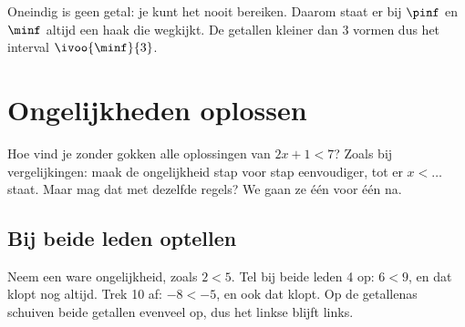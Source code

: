 Oneindig is geen getal: je kunt het nooit bereiken. Daarom staat er bij $\pinf$ en $\minf$ altijd een haak die wegkijkt. De getallen kleiner dan 3 vormen dus het interval $\ivoo{\minf}{3}$.



\begin{oefeningen}

\end{oefeningen}

\section{Ongelijkheden oplossen}

Hoe vind je zonder gokken alle oplossingen van $2x + 1 < 7$? Zoals bij vergelijkingen: maak de ongelijkheid stap voor stap eenvoudiger, tot er $x < \ldots$ staat. Maar mag dat met dezelfde regels? We gaan ze één voor één na.

\subsection{Bij beide leden optellen}

Neem een ware ongelijkheid, zoals $2 < 5$. Tel bij beide leden 4 op: $6 < 9$, en dat klopt nog altijd. Trek 10 af: $-8 < -5$, en ook dat klopt. Op de getallenas schuiven beide getallen evenveel op, dus het linkse blijft links.


